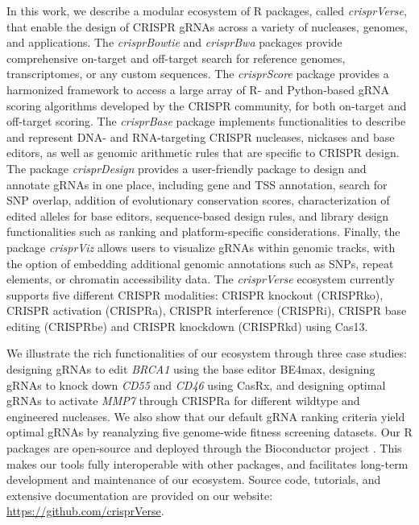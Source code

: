 \documentclass[pdftex,english,10pt]{article}
\begin{document}
In this work, we describe a modular ecosystem of R packages, called \textit{crisprVerse}, that enable the design of CRISPR gRNAs across a variety of nucleases, genomes, and applications. The \textit{crisprBowtie} and \textit{crisprBwa} packages provide comprehensive on-target and off-target search for reference genomes, transcriptomes, or any custom sequences. The \textit{crisprScore} package provides a harmonized framework to access a large array of R- and Python-based gRNA scoring algorithms developed by the CRISPR community, for both on-target and off-target scoring. The \textit{crisprBase} package implements functionalities to describe and represent DNA- and RNA-targeting CRISPR  nucleases, nickases and base editors, as well as genomic arithmetic rules that are specific to CRISPR design. The package \textit{crisprDesign} provides a user-friendly package to design and annotate gRNAs in one place, including gene and TSS annotation, search for SNP overlap, addition of evolutionary conservation scores, characterization of edited alleles for base editors, sequence-based design rules, and library design functionalities such as ranking and platform-specific considerations. Finally, the package \textit{crisprViz} allows users to visualize gRNAs within genomic tracks, with the option of embedding additional genomic annotations such as SNPs, repeat elements, or chromatin accessibility data. The \textit{crisprVerse} ecosystem currently supports five different CRISPR modalities: CRISPR knockout (CRISPRko), CRISPR activation (CRISPRa), CRISPR interference (CRISPRi), CRISPR base editing (CRISPRbe) and CRISPR knockdown (CRISPRkd) using Cas13.  


We illustrate the rich functionalities of our ecosystem through three case studies: designing gRNAs to edit \textit{BRCA1} using the base editor BE4max, designing gRNAs to knock down \textit{CD55} and \textit{CD46} using CasRx, and designing optimal gRNAs to activate \textit{MMP7} through CRISPRa for different wildtype and engineered nucleases. We also show that our default gRNA ranking criteria yield optimal gRNAs by reanalyzing five genome-wide fitness screening datasets. Our R packages are open-source and deployed through the Bioconductor project \citep{bioc1,bioc2}. This makes our tools fully interoperable with other packages, and facilitates long-term development and maintenance of our ecosystem. Source code, tutorials, and extensive documentation are provided on our website: \url{https://github.com/crisprVerse}.
\end{document}
